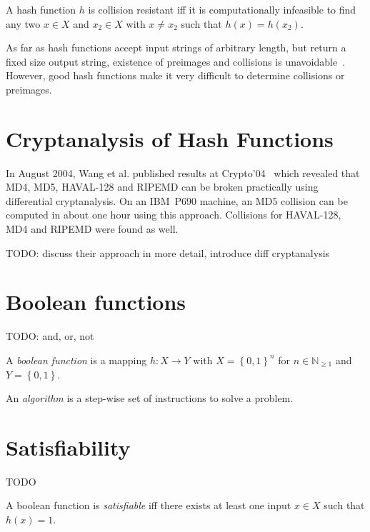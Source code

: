 \begin{defi}
  A hash function $h$ is collision resistant iff it is computationally infeasible to
  find any two $x \in X$ and $x_2 \in X$ with $x \neq x_2$ such that $h(x) = h(x_2)$.
\end{defi}

As far as hash functions accept input strings of arbitrary length, but return a fixed
size output string, existence of preimages and collisions is unavoidable~\cite{schlaffer}.
However, good hash functions make it very difficult to determine collisions or preimages.

\section{Cryptanalysis of Hash Functions}
\label{ch:cryptanalysis}
%
In August 2004, Wang et al. published results at Crypto'04~\cite{wang2004} which revealed
that MD4, MD5, HAVAL-128 and RIPEMD can be broken practically using differential cryptanalysis.
On an IBM~P690 machine, an MD5 collision can be computed in about one hour using this approach.
Collisions for HAVAL-128, MD4 and RIPEMD were found as well.

TODO: discuss their approach in more detail, introduce diff cryptanalysis

\section{Boolean functions}
\label{ch:bool-functions}
%
TODO: and, or, not

\begin{defi}
  A \emph{boolean function} is a mapping $h: X \to Y$ with $X = \left\{0,1\right\}^n$
  for $n \in \mathbb N_{\geq 1}$ and $Y = \left\{0,1\right\}$.
\end{defi}

\begin{defi}
  An \emph{algorithm} is a step-wise set of instructions to solve a problem.
\end{defi}

\section{Satisfiability}
\label{ch:sat}
%
TODO

\begin{defi}
  A boolean function is \emph{satisfiable} iff there exists at least one
  input $x \in X$ such that $h(x) = 1$.
\end{defi}

